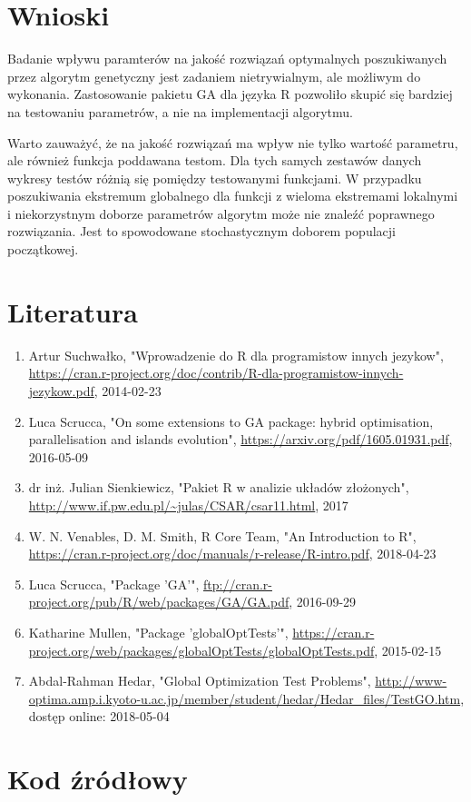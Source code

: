 \documentclass{article}
\begin{document}
\section{Wnioski}

Badanie wpływu paramterów na jakość rozwiązań optymalnych poszukiwanych przez algorytm genetyczny jest zadaniem nietrywialnym, ale możliwym do wykonania. Zastosowanie pakietu GA dla języka R pozwoliło skupić się bardziej na testowaniu parametrów, a nie na implementacji algorytmu.

Warto zauważyć, że na jakość rozwiązań ma wpływ nie tylko wartość parametru, ale również funkcja poddawana testom. Dla tych samych zestawów danych wykresy testów różnią się pomiędzy testowanymi funkcjami. W przypadku poszukiwania ekstremum globalnego dla funkcji z wieloma ekstremami lokalnymi i  niekorzystnym doborze parametrów  algorytm  może nie znaleźć poprawnego rozwiązania. Jest to spowodowane stochastycznym doborem populacji początkowej.



\section{Literatura}
\begin{enumerate}
\item Artur Suchwałko, "Wprowadzenie do R dla programistow innych jezykow", \url{https://cran.r-project.org/doc/contrib/R-dla-programistow-innych-jezykow.pdf}, 2014-02-23
\item Luca Scrucca, "On some extensions to GA package:
hybrid optimisation, parallelisation and islands evolution", \url{https://arxiv.org/pdf/1605.01931.pdf}, 2016-05-09
\item dr inż. Julian Sienkiewicz, "Pakiet R w analizie układów złożonych", \url{http://www.if.pw.edu.pl/~julas/CSAR/csar11.html}, 2017
\item W. N. Venables, D. M. Smith, R Core Team, "An Introduction to R", \url{https://cran.r-project.org/doc/manuals/r-release/R-intro.pdf}, 2018-04-23
\item Luca Scrucca, "Package 'GA'", \url{ftp://cran.r-project.org/pub/R/web/packages/GA/GA.pdf}, 2016-09-29
\item Katharine Mullen, "Package 'globalOptTests'", \url{https://cran.r-project.org/web/packages/globalOptTests/globalOptTests.pdf},
2015-02-15
\item Abdal-Rahman Hedar, "Global Optimization Test Problems", \url{http://www-optima.amp.i.kyoto-u.ac.jp/member/student/hedar/Hedar_files/TestGO.htm}, dostęp online: 2018-05-04
\end{enumerate}

\section{Kod źródłowy}

\lstset{
    language=R,   
    extendedchars=true,
    inputencoding=latin1,
     basicstyle=\small
}


\end{document}
